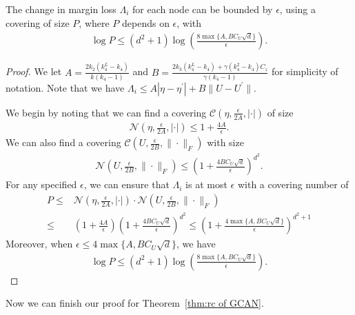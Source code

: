\begin{lemma}
    The change in margin loss $\Lambda_i$ for each node can be bounded by $\epsilon$, using a covering of size $P$, where $P$ depends on $\epsilon$, with 
    \begin{align*}
        \log P \leq (d^2+1)\log \left(\frac{8\max\{A, BC_U\sqrt{d}\}}{\epsilon}\right).
    \end{align*}  
\end{lemma}
\begin{proof}
    We let $A = \frac{2k_2(k_4^L - k_4)}{k (k_4 - 1)}$ and $B = \frac{2k_3(k_4^L-k_4) + \gamma(k_4^2-k_4)C_z}{\gamma(k_4-1)}$ for simplicity of notation. Note that we have $\Lambda_i \leq A|\eta - \eta^\prime | + B \|U - U^\prime \|$.
    
    We begin by noting that we can find a covering $\mathcal{C}(\eta, \frac{\epsilon}{2A}, |\cdot |)$ of size
    \begin{align*}
        \mathcal{N}\left(\eta, \frac{\epsilon}{2A}, |\cdot |\right) \leq 1 + \frac{4A}{\epsilon}.
    \end{align*}
    We can also find a covering $\mathcal{C}(U, \frac{\epsilon}{2B}, \|\cdot \|_F)$ with size 
    \begin{align*}
        \mathcal{N}\left(U, \frac{\epsilon}{2B}, \|\cdot \|_F\right) \leq \left(1 + \frac{4BC_U\sqrt{d}}{\epsilon} \right)^{d^2}.
    \end{align*}
    For any specified $\epsilon$, we can ensure that $\Lambda_i$ is at most $\epsilon$ with a covering number of 
    \begin{align*}
        P 
        \leq&
        \mathcal{N}\left(\eta, \frac{\epsilon}{2A}, |\cdot |\right) \cdot \mathcal{N}\left(U, \frac{\epsilon}{2B}, \|\cdot \|_F\right)\\
        \leq&
        \left( 1 + \frac{4A}{\epsilon}\right)\left(1 + \frac{4BC_U\sqrt{d}}{\epsilon} \right)^{d^2} 
        \leq
        \left(1 + \frac{4\max\{A, BC_U\sqrt{d}\}}{\epsilon}\right)^{d^2+1}
    \end{align*}
    Moreover, when $\epsilon \leq 4\max\{A, BC_U\sqrt{d}\}$, we have 
    \begin{align*}
        \log P \leq (d^2+1)\log \left(\frac{8\max\{A, BC_U\sqrt{d}\}}{\epsilon}\right).
    \end{align*}    
\end{proof}

Now we can finish our proof for Theorem~\ref{thm:rc of GCAN}.

